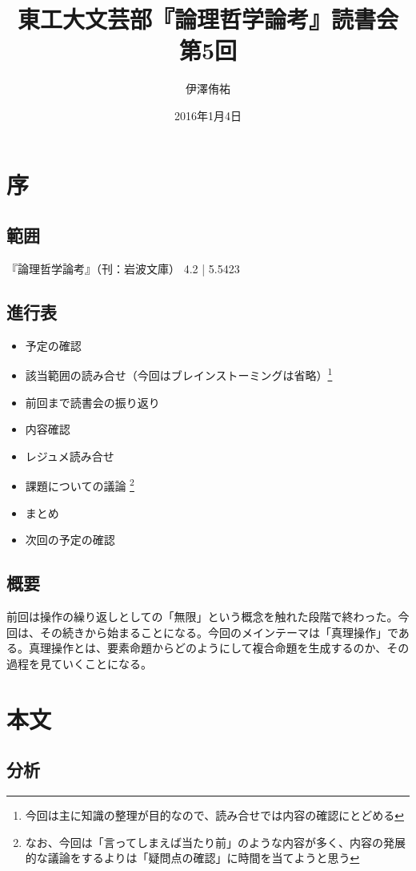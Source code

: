 \documentclass[a4paper,onecolumn,article]{jarticle}
\title{東工大文芸部『論理哲学論考』読書会 第5回}
\author{伊澤侑祐}
\date{2016年1月4日}
\newcounter{ct}               %
\begin{document}
\maketitle

\section{序}
\subsection*{範囲}
『論理哲学論考』（刊：岩波文庫） 4.2 | 5.5423
\subsection*{進行表}

\begin{itemize}
  \item 予定の確認
  \item 該当範囲の読み合せ（今回はブレインストーミングは省略）\footnote{今回は主に知識の整理が目的なので、読み合せでは内容の確認にとどめる}
  \item 前回まで読書会の振り返り
  \item 内容確認
  \item レジュメ読み合せ
  \item 課題についての議論 \footnote{なお、今回は「言ってしまえば当たり前」のような内容が多く、内容の発展的な議論をするよりは「疑問点の確認」に時間を当てようと思う}
  \item まとめ
  \item 次回の予定の確認
\end{itemize}

\subsection{概要}
前回は操作の繰り返しとしての「無限」という概念を触れた段階で終わった。今回は、その続きから始まることになる。今回のメインテーマは「真理操作」である。真理操作とは、要素命題からどのようにして複合命題を生成するのか、その過程を見ていくことになる。

\section{本文}

\subsection{分析}
\end{document}
